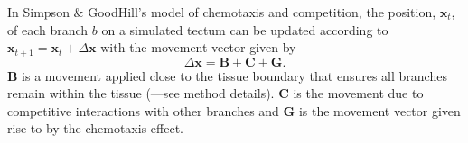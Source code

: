 \documentclass[9pt]{elife} %
\begin{document}
In Simpson \& GoodHill's model of chemotaxis and competition, the position, $\mathbf{x}_t$, of each branch $b$ on a simulated tectum can be updated according to $\mathbf{x}_{t+1} = \mathbf{x}_{t} + \Delta \mathbf{x}$ with the movement vector given by
\begin{equation} \label{e:dX}
 \Delta \mathbf{x} = \mathbf{B} + \mathbf{C} + \mathbf{G}.
\end{equation}
$\mathbf{B}$ is a movement applied close to the tissue boundary that ensures all branches remain within the tissue (\citet{holt_target_1998}---see method details).
%
%
$\mathbf{C}$ is the movement due to competitive interactions with other branches
%
and $\mathbf{G}$ is the movement vector given rise to by the chemotaxis effect.


%




\end{document}
